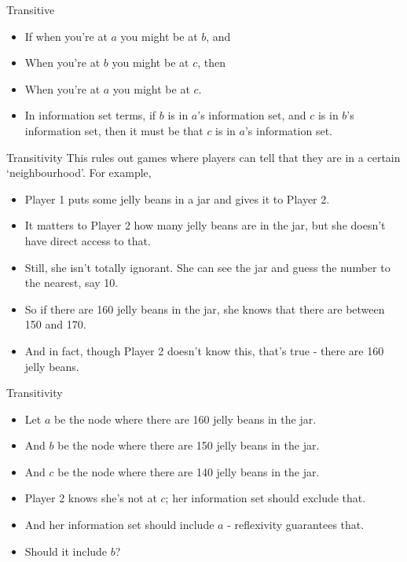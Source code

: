 \documentclass[
  ignorenonframetext,
]{beamer}
\providecommand{\tightlist}{%
  \setlength{\itemsep}{0pt}\setlength{\parskip}{0pt}}
\begin{document}
\begin{frame}{Transitive}
\protect\hypertarget{transitive}{}
\begin{itemize}
\tightlist
\item
  If when you're at \(a\) you might be at \(b\), and
\item
  When you're at \(b\) you might be at \(c\), then
\item
  When you're at \(a\) you might be at \(c\).
\item
  In information set terms, if \(b\) is in \(a\)'s information set, and
  \(c\) is in \(b\)'s information set, then it must be that \(c\) is in
  \(a\)'s information set.
\end{itemize}
\end{frame}

\begin{frame}{Transitivity}
\protect\hypertarget{transitivity}{}
This rules out games where players can tell that they are in a certain
`neighbourhood'. For example,

\begin{itemize}
\tightlist
\item
  Player 1 puts some jelly beans in a jar and gives it to Player 2.
\item
  It matters to Player 2 how many jelly beans are in the jar, but she
  doesn't have direct access to that.
\item
  Still, she isn't totally ignorant. She can see the jar and guess the
  number to the nearest, say 10.
\item
  So if there are 160 jelly beans in the jar, she knows that there are
  between 150 and 170.
\item
  And in fact, though Player 2 doesn't know this, that's true - there
  are 160 jelly beans.
\end{itemize}
\end{frame}

\begin{frame}{Transitivity}
\protect\hypertarget{transitivity-1}{}
\begin{itemize}
\tightlist
\item
  Let \(a\) be the node where there are 160 jelly beans in the jar.
\item
  And \(b\) be the node where there are 150 jelly beans in the jar.
\item
  And \(c\) be the node where there are 140 jelly beans in the jar.
\item
  Player 2 knows she's not at \(c\); her information set should exclude
  that.
\item
  And her information set should include \(a\) - reflexivity guarantees
  that.
\item
  Should it include \(b\)?
\end{itemize}
\end{frame}
\end{document}
